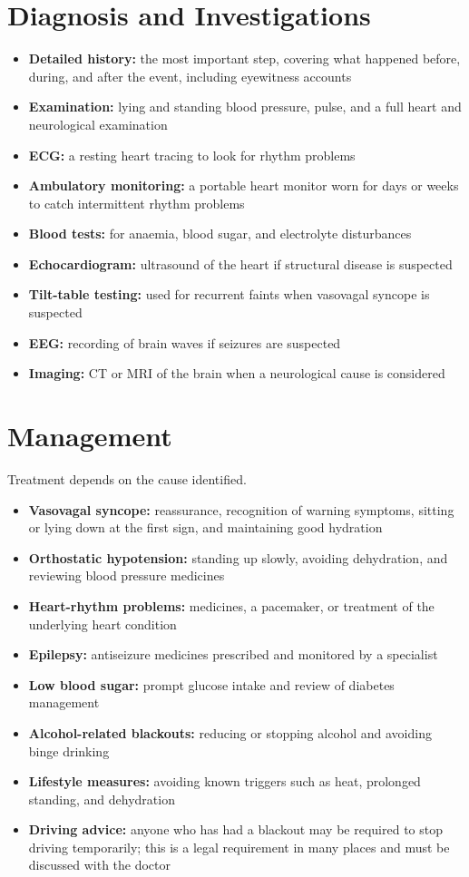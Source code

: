 \section*{Diagnosis and Investigations}
\begin{itemize}
    \item \textbf{Detailed history:} the most important step, covering what happened before, during, and after the event, including eyewitness accounts
    \item \textbf{Examination:} lying and standing blood pressure, pulse, and a full heart and neurological examination
    \item \textbf{ECG:} a resting heart tracing to look for rhythm problems
    \item \textbf{Ambulatory monitoring:} a portable heart monitor worn for days or weeks to catch intermittent rhythm problems
    \item \textbf{Blood tests:} for anaemia, blood sugar, and electrolyte disturbances
    \item \textbf{Echocardiogram:} ultrasound of the heart if structural disease is suspected
    \item \textbf{Tilt-table testing:} used for recurrent faints when vasovagal syncope is suspected
    \item \textbf{EEG:} recording of brain waves if seizures are suspected
    \item \textbf{Imaging:} CT or MRI of the brain when a neurological cause is considered
\end{itemize}

\section*{Management}
Treatment depends on the cause identified.

\begin{itemize}
    \item \textbf{Vasovagal syncope:} reassurance, recognition of warning symptoms, sitting or lying down at the first sign, and maintaining good hydration
    \item \textbf{Orthostatic hypotension:} standing up slowly, avoiding dehydration, and reviewing blood pressure medicines
    \item \textbf{Heart-rhythm problems:} medicines, a pacemaker, or treatment of the underlying heart condition
    \item \textbf{Epilepsy:} antiseizure medicines prescribed and monitored by a specialist
    \item \textbf{Low blood sugar:} prompt glucose intake and review of diabetes management
    \item \textbf{Alcohol-related blackouts:} reducing or stopping alcohol and avoiding binge drinking
    \item \textbf{Lifestyle measures:} avoiding known triggers such as heat, prolonged standing, and dehydration
    \item \textbf{Driving advice:} anyone who has had a blackout may be required to stop driving temporarily; this is a legal requirement in many places and must be discussed with the doctor
\end{itemize}

